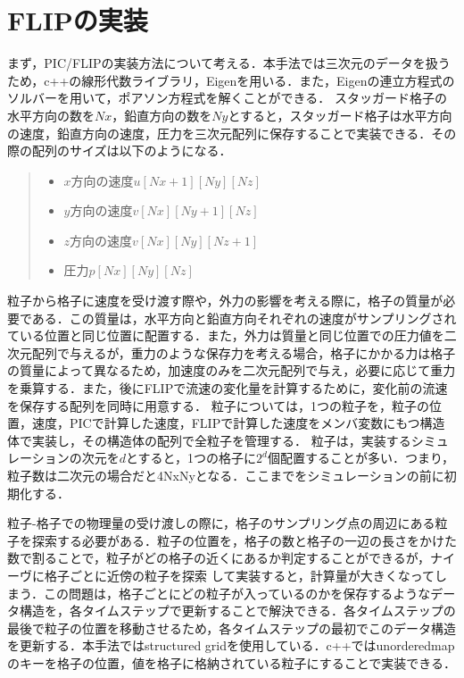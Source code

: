 \documentclass[a4j,12pt]{jreport}
\begin{document}
\section{FLIPの実装} \label{sec:ImpFLIP}
まず，PIC/FLIPの実装方法について考える．本手法では三次元のデータを扱うため，c++の線形代数ライブラリ，Eigenを用いる．また，Eigenの連立方程式のソルバーを用いて，ポアソン方程式を解くことができる．
スタッガード格子の水平方向の数を$Nx$，鉛直方向の数を$Ny$とすると，スタッガード格子は水平方向の速度，鉛直方向の速度，圧力を三次元配列に保存することで実装できる．その際の配列のサイズは以下のようになる．
\begin{quote}
	\begin{itemize}
		\item $x方向の速度 u[Nx+1][Ny][Nz]$ 
		\item $y方向の速度 v[Nx][Ny+1][Nz]$ 
		\item $z方向の速度 v[Nx][Ny][Nz+1]$ 
		\item $圧力 p[Nx][Ny][Nz]$
	\end{itemize}
\end{quote}
粒子から格子に速度を受け渡す際や，外力の影響を考える際に，格子の質量が必要である．この質量は，水平方向と鉛直方向それぞれの速度がサンプリングされている位置と同じ位置に配置する．また，外力は質量と同じ位置での圧力値を二次元配列で与えるが，重力のような保存力を考える場合，格子にかかる力は格子の質量によって異なるため，加速度のみを二次元配列で与え，必要に応じて重力を乗算する．また，後にFLIPで流速の変化量を計算するために，変化前の流速を保存する配列を同時に用意する．
粒子については，1つの粒子を，粒子の位置，速度，PICで計算した速度，FLIPで計算した速度をメンバ変数にもつ構造体で実装し，その構造体の配列で全粒子を管理する．
粒子は，実装するシミュレーションの次元を$d$とすると，1つの格子に$2^d$個配置することが多い．つまり，粒子数は二次元の場合だと4NxNyとなる．ここまでをシミュレーションの前に初期化する．

粒子-格子での物理量の受け渡しの際に，格子のサンプリング点の周辺にある粒子を探索する必要がある．粒子の位置を，格子の数と格子の一辺の長さをかけた数で割ることで，粒子がどの格子の近くにあるか判定することができるが，ナイーヴに格子ごとに近傍の粒子を探索
して実装すると，計算量が大きくなってしまう．この問題は，格子ごとにどの粒子が入っているのかを保存するようなデータ構造を，各タイムステップで更新することで解決できる．各タイムステップの最後で粒子の位置を移動させるため，各タイムステップの最初でこのデータ構造を更新する．本手法ではstructured gridを使用している．c++ではunorderedmapのキーを格子の位置，値を格子に格納されている粒子にすることで実装できる．
\end{document}
